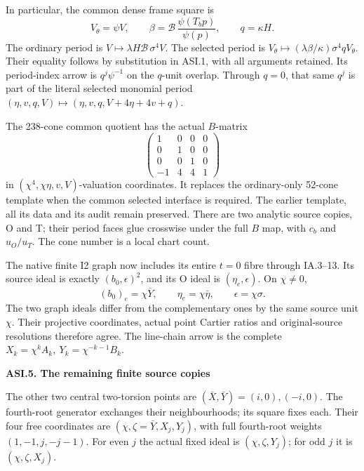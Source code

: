 In particular, the common dense frame square is
\[
 V_\theta=\psi V,\qquad
 \beta=\mathcal B\,\frac{\psi(T_bp)}{\psi(p)},\qquad
 q=\kappa H .
 \tag{ASI.1}
\]
The ordinary period is
\(V\mapsto\lambda H\mathcal B\,\sigma^4V\).
The selected period is
\(V_\theta\mapsto(\lambda\beta/\kappa)\sigma^4qV_\theta\).
Their equality follows by substitution in ASI.1,
with all arguments retained. Its period-index arrow
is \(q^j\psi^{-1}\) on the \(q\)-unit overlap.
Through \(q=0\), that same \(q^j\) is part of the
literal selected monomial period
\((\eta,v,q,V)\mapsto(\eta,v,q,V+4\eta+4v+q)\).

The 238-cone common quotient has the actual
\(B\)-matrix
\[
 \begin{pmatrix}1&0&0&0\\0&1&0&0\\0&0&1&0\\-1&4&4&1\end{pmatrix}
\]
in \((\chi^4,\chi\eta,v,V)\)-valuation coordinates.
It replaces the ordinary-only 52-cone template
when the common selected interface is required.
The earlier template, all its data and its audit
remain preserved. There are two analytic source
copies, O and T; their period faces glue crosswise
under the full \(B\) map, with \(c_b\) and
\(u_O/u_T\). The cone number is a local chart count.

The native finite I2 graph now includes its entire
\(t=0\) fibre through IA.3--13. Its source ideal
is exactly \((b_0,\epsilon)^2\), and its O
ideal is \((\eta_e,\epsilon)\). On \(\chi\ne0\),
\[
 (b_0)_e=\chi\bar Y,\qquad
 \eta_e=\chi\bar\eta,\qquad\epsilon=\chi\sigma.
\]
The two graph ideals differ from the complementary
ones by the same source unit \(\chi\).
Their projective coordinates, actual point
Cartier ratios and original-source resolutions
therefore agree. The line-chain arrow is the
complete \(X_k=\chi^kA_k,\ 
Y_k=\chi^{-k-1}B_k\).

\par

\medskip\noindent\textbf{ASI.5. The remaining finite source copies}

\par\nobreak

The other two central two-torsion points are
\((\bar X,\bar Y)=(i,0),(-i,0)\).
The fourth-root generator exchanges their
neighbourhoods; its square fixes each.
Their four free coordinates are
\((\chi,\zeta=\bar Y,X_j,Y_j)\), with full
fourth-root weights \((1,-1,j,-j-1)\).
For even \(j\) the actual fixed ideal is
\((\chi,\zeta,Y_j)\); for odd \(j\) it is
\((\chi,\zeta,X_j)\).


